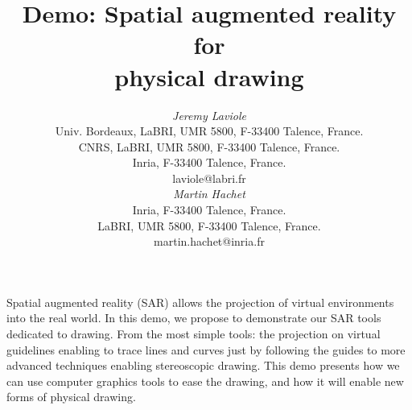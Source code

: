 \documentclass{article}
\begin{document}




\title{Demo: Spatial augmented reality for \\
       physical drawing}



\author{
\parbox[t]{9cm}{\centering
	     {\em Jeremy Laviole}\\
	     Univ. Bordeaux, LaBRI, UMR 5800, F-33400 Talence, France.\\
         CNRS, LaBRI, UMR 5800, F-33400 Talence, France.\\
	     Inria, F-33400 Talence, France.\\
	     laviole@labri.fr}
\parbox[t]{9cm}{\centering
	     {\em Martin Hachet}\\
	     Inria, F-33400 Talence, France.\\
	     LaBRI, UMR 5800, F-33400 Talence, France.\\
	     martin.hachet@inria.fr}
}


\maketitle

\abstract
Spatial augmented reality (SAR) allows the projection of virtual environments into the real world. In this demo, we propose to demonstrate our SAR tools dedicated to drawing. 
From the most simple tools: the projection on virtual guidelines enabling to trace lines and curves just by following the guides to more advanced techniques enabling stereoscopic drawing. This demo presents how we can use computer graphics tools to ease the drawing, and how it will enable new forms of physical drawing. 
\end{document}
